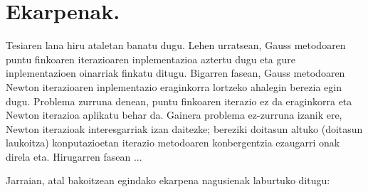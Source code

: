 \section{Ekarpenak.}

Tesiaren lana hiru ataletan banatu dugu. Lehen urratsean, Gauss metodoaren puntu finkoaren iterazioaren inplementazioa aztertu dugu eta gure inplementazioen oinarriak finkatu ditugu. Bigarren fasean, Gauss metodoaren Newton iterazioaren inplementazio eraginkorra lortzeko ahalegin berezia egin dugu. Problema zurruna denean, puntu finkoaren iterazio ez da eraginkorra eta Newton iterazioa aplikatu behar da. Gainera problema ez-zurruna izanik ere, Newton iterazioak interesgarriak izan daitezke; bereziki doitasun altuko (doitasun
laukoitza) konputazioetan iterazio metodoaren konbergentzia ezaugarri onak direla eta.  Hirugarren fasean ...

Jarraian, atal bakoitzean egindako ekarpena nagusienak laburtuko ditugu:

